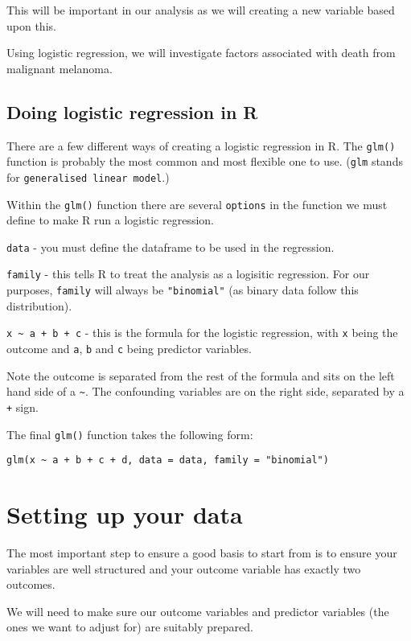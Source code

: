 \documentclass[]{book}
\theoremstyle{definition}
\theoremstyle{definition}
\theoremstyle{definition}
\theoremstyle{remark}
\begin{document}
This will be important in our analysis as we will creating a new
variable based upon this.

Using logistic regression, we will investigate factors associated with
death from malignant melanoma.

\subsection{Doing logistic regression in
R}\label{doing-logistic-regression-in-r}

There are a few different ways of creating a logistic regression in R.
The \texttt{glm()} function is probably the most common and most
flexible one to use. (\texttt{glm} stands for
\texttt{generalised\ linear\ model}.)

Within the \texttt{glm()} function there are several \texttt{options} in
the function we must define to make R run a logistic regression.

\texttt{data} - you must define the dataframe to be used in the
regression.

\texttt{family} - this tells R to treat the analysis as a logisitic
regression. For our purposes, \texttt{family} will always be
\texttt{"binomial"} (as binary data follow this distribution).

\texttt{x\ \textasciitilde{}\ a\ +\ b\ +\ c} - this is the formula for
the logistic regression, with \texttt{x} being the outcome and
\texttt{a}, \texttt{b} and \texttt{c} being predictor variables.

Note the outcome is separated from the rest of the formula and sits on
the left hand side of a \texttt{\textasciitilde{}}. The confounding
variables are on the right side, separated by a \texttt{+} sign.

The final \texttt{glm()} function takes the following form:

\texttt{glm(x\ \textasciitilde{}\ a\ +\ b\ +\ c\ +\ d,\ data\ =\ data,\ family\ =\ "binomial")}

\section{Setting up your data}\label{setting-up-your-data}

The most important step to ensure a good basis to start from is to
ensure your variables are well structured and your outcome variable has
exactly two outcomes.

We will need to make sure our outcome variables and predictor variables
(the ones we want to adjust for) are suitably prepared.
\end{document}
